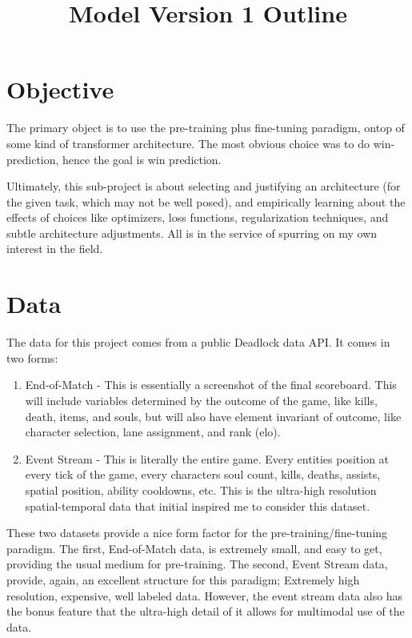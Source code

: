 \documentclass[11pt]{article}
\title{Model Version 1 Outline}
\author{}
\date{}
\begin{document}
\maketitle


\section{Objective}
    The primary object is to use the pre-training plus fine-tuning paradigm, ontop of some kind of transformer 
    architecture. The most obvious choice was to do win-prediction, hence the goal is win prediction. 

    Ultimately, this sub-project is about selecting and justifying an architecture (for the given task, which may 
    not be well posed), and empirically learning about the effects of choices like optimizers, loss functions, 
    regularization techniques, and subtle architecture adjustments. All is in the service of spurring on my own 
    interest in the field.



\section{Data}
    The data for this project comes from a public Deadlock data API. It comes in two forms:
    \begin{enumerate}
        \item End-of-Match - This is essentially a screenshot of the final scoreboard. This will include variables determined by the outcome of the game, like kills, death, items, and souls, but will also have element invariant of outcome, like character selection, lane assignment, and rank (elo).
        \item Event Stream - This is literally the entire game. Every entities position at every tick of the game, every characters soul count, kills, deaths, assists, spatial position, ability cooldowns, etc. This is the ultra-high resolution spatial-temporal data that initial inspired me to consider this dataset.
    \end{enumerate}
    These two datasets provide a nice form factor for the pre-training/fine-tuning paradigm. The first, End-of-Match data, is extremely small, and easy to get, providing the usual medium for pre-training. The second, Event Stream data, provide, again, an excellent structure for this paradigm; Extremely high resolution, expensive, well labeled data. However, the event stream data also has the bonus feature that the ultra-high detail of it allows for multimodal use of the data.
\end{document}
